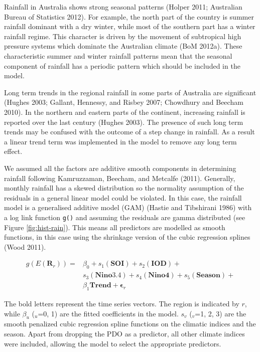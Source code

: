 \documentclass[]{elsarticle} %
\theoremstyle{definition}
\theoremstyle{definition}
\theoremstyle{definition}
\theoremstyle{remark}
\begin{document}
Rainfall in Australia shows strong seasonal patterns (Holper 2011;
Australian Bureau of Statistics 2012). For example, the north part of
the country is summer rainfall dominant with a dry winter, while most of
the southern part has a winter rainfall regime. This character is driven
by the movement of subtropical high pressure systems which dominate the
Australian climate (BoM 2012a). These characteristic summer and winter
rainfall patterns mean that the seasonal component of rainfall has a
periodic pattern which should be included in the model.

Long term trends in the regional rainfall in some parts of Australia are
significant (Hughes 2003; Gallant, Hennessy, and Risbey 2007; Chowdhury
and Beecham 2010). In the northern and eastern parts of the continent,
increasing rainfall is reported over the last century (Hughes 2003). The
presence of such long term trends may be confused with the outcome of a
step change in rainfall. As a result a linear trend term was implemented
in the model to remove any long term effect.

We assumed all the factors are additive smooth components in determining
rainfall following Kamruzzaman, Beecham, and Metcalfe (2011). Generally,
monthly rainfall has a skewed distribution so the normality assumption
of the residuals in a general linear model could be violated. In this
case, the rainfall model is a generalised additive model (GAM) (Hastie
and Tibshirani 1986) with a log link function \texttt{g()} and assuming
the residuals are gamma distributed (see Figure \ref{fig:hist-rain}).
This means all predictors are modelled as smooth functions, in this case
using the shrinkage version of the cubic regression splines (Wood 2011).
\vspace{0.5cm}

\begin{equation}
\begin{array}{lll}
g(E(\mathbf{R}_r)) = &\beta_0 + s_1(\mathbf{SOI}) + s_2(\mathbf{IOD}) + \\                &s_3(\mathbf{Nino3.4}) + s_4(\mathbf{Nino4}) + s_5(\mathbf{Season}) + \\
           &\beta_1\mathbf{Trend} + \boldsymbol{\epsilon}_r
\end{array}
\label{eq:model}
\end{equation}

The bold letters represent the time series vectors. The region is
indicated by \(r\), while \(\beta_u\) (\(_u\)=0, 1) are the fitted
coefficients in the model. \(s_v\) (\(_v\)=1, 2, 3) are the smooth
penalized cubic regression spline functions on the climatic indices and
the season. Apart from dropping the PDO as a predictor, all other
climate indices were included, allowing the model to select the
appropriate predictors.
\end{document}
